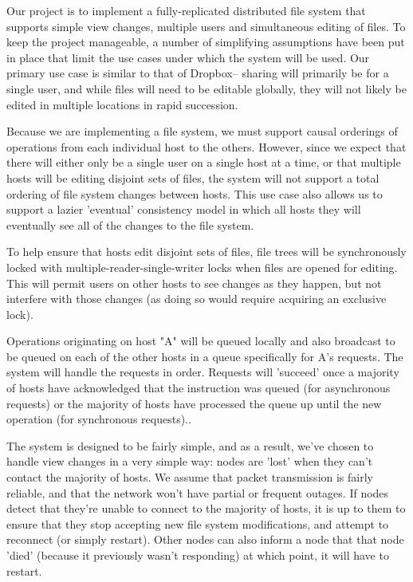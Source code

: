 Our project is to implement a fully-replicated distributed file system that
supports simple view changes, multiple users and simultaneous editing of files.
To keep the project manageable, a number of simplifying assumptions have been
put in place that limit the use cases under which the system will be used. Our
primary use case is similar to that of Dropbox-- sharing will primarily be for a
single user, and while files will need to be editable globally, they will not
likely be edited in multiple locations in rapid succession.

Because we are implementing a file system, we must support causal orderings of
operations from each individual host to the others. However, since we expect
that there will either only be a single user on a single host at a time, or that
multiple hosts will be editing disjoint sets of files, the system will not
support a total ordering of file system changes between hosts. This use case
also allows us to support a lazier 'eventual' consistency model in which all
hosts they will eventually see all of the changes to the file system.

To help ensure that hosts edit disjoint sets of files, file trees will be
synchronously locked with multiple-reader-single-writer locks when files are
opened for editing. This will permit users on other hosts to see changes as they
happen, but not interfere with those changes (as doing so would require
acquiring an exclusive lock).

Operations originating on host "A" will be queued locally and also broadcast to
be queued on each of the other hosts in a queue specifically for A's requests.
The system will handle the requests in order. Requests will 'succeed' once a
majority of hosts have acknowledged that the instruction was queued (for
asynchronous requests) or the majority of hosts have processed the queue up
until the new operation (for synchronous requests)..

The system is designed to be fairly simple, and as a result, we've chosen to
handle view changes in a very simple way: nodes are 'lost' when they can't
contact the majority of hosts. We assume that packet transmission is fairly
reliable, and that the network won't have partial or frequent outages. If nodes
detect that they're unable to connect to the majority of hosts, it is up to them
to ensure that they stop accepting new file system modifications, and attempt to
reconnect (or simply restart). Other nodes can also inform a node that that node
'died' (because it previously wasn't responding) at which point, it will have to
restart.

